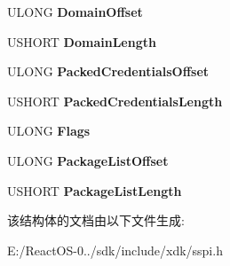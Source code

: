 \begin{DoxyCompactItemize}
U\+L\+O\+NG {\bfseries Domain\+Offset}
\item 
\mbox{\label{struct___s_e_c___w_i_n_n_t___a_u_t_h___i_d_e_n_t_i_t_y___e_x2_a36b8f7fdf43685122adb6043fb7de67c}} 
U\+S\+H\+O\+RT {\bfseries Domain\+Length}
\item 
\mbox{\label{struct___s_e_c___w_i_n_n_t___a_u_t_h___i_d_e_n_t_i_t_y___e_x2_a5a0e1eb9c4921d16febddeda0f038338}} 
U\+L\+O\+NG {\bfseries Packed\+Credentials\+Offset}
\item 
\mbox{\label{struct___s_e_c___w_i_n_n_t___a_u_t_h___i_d_e_n_t_i_t_y___e_x2_a6e77e18fe62ba717ae20b287e0425472}} 
U\+S\+H\+O\+RT {\bfseries Packed\+Credentials\+Length}
\item 
\mbox{\label{struct___s_e_c___w_i_n_n_t___a_u_t_h___i_d_e_n_t_i_t_y___e_x2_a769d670daa4449abffc328fab19c535c}} 
U\+L\+O\+NG {\bfseries Flags}
\item 
\mbox{\label{struct___s_e_c___w_i_n_n_t___a_u_t_h___i_d_e_n_t_i_t_y___e_x2_ad52c0c375eea8163aaf28d7c8182c657}} 
U\+L\+O\+NG {\bfseries Package\+List\+Offset}
\item 
\mbox{\label{struct___s_e_c___w_i_n_n_t___a_u_t_h___i_d_e_n_t_i_t_y___e_x2_adafecabfb4c2b0ad0d0fd2c19cdb632f}} 
U\+S\+H\+O\+RT {\bfseries Package\+List\+Length}
\end{DoxyCompactItemize}


该结构体的文档由以下文件生成\+:\begin{DoxyCompactItemize}
\item 
E\+:/\+React\+O\+S-\/0../sdk/include/xdk/sspi.\+h\end{DoxyCompactItemize}
